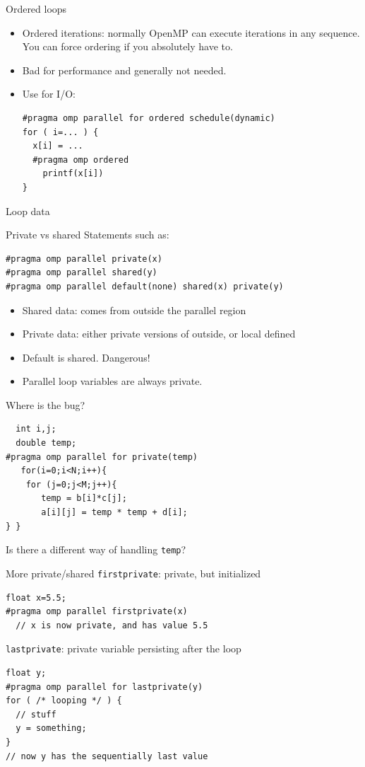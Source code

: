 \begin{numberedframe}{Ordered loops}
  \begin{itemize}
  \item Ordered iterations: normally OpenMP can execute iterations in
    any sequence.
    You can force ordering if you absolutely have to.
  \item Bad for performance and generally not needed.
  \item Use for I/O:
\begin{lstlisting}
#pragma omp parallel for ordered schedule(dynamic)
for ( i=... ) {
  x[i] = ...
  #pragma omp ordered
    printf(x[i])
}
\end{lstlisting}
  \end{itemize}
\end{numberedframe}

 {Loop data}

\begin{numberedframe}{Private vs shared}
Statements such as:
\begin{lstlisting}
#pragma omp parallel private(x)
#pragma omp parallel shared(y)
#pragma omp parallel default(none) shared(x) private(y)
\end{lstlisting}
  \begin{itemize}
  \item Shared data: comes from outside the parallel region
  \item Private data: either private versions of outside, or local defined
  \item Default is shared. Dangerous!
  \item Parallel loop variables are always private.
  \end{itemize}
\end{numberedframe}

\begin{numberedframe}{Where is the bug?}
\begin{lstlisting}
  int i,j;
  double temp;
#pragma omp parallel for private(temp)
   for(i=0;i<N;i++){
    for (j=0;j<M;j++){
       temp = b[i]*c[j];
       a[i][j] = temp * temp + d[i];
} }  
\end{lstlisting}
Is there a different way of handling \lstinline{temp}?
\end{numberedframe}

\begin{numberedframe}{More private/shared}
\lstinline{firstprivate}: private, but initialized
\begin{lstlisting}
float x=5.5;
#pragma omp parallel firstprivate(x)
  // x is now private, and has value 5.5
\end{lstlisting}

\lstinline{lastprivate}: private variable persisting after the loop
\begin{lstlisting}
float y;
#pragma omp parallel for lastprivate(y)
for ( /* looping */ ) {
  // stuff
  y = something;
}
// now y has the sequentially last value
\end{lstlisting}
\end{numberedframe}

